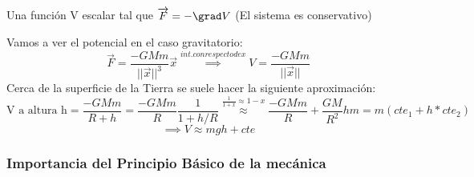 \begin{defn}
	Una función V escalar tal que $\overrightarrow F = -\grad V$ (El sistema es conservativo)
\end{defn}

\begin{example}
	Vamos a ver el potencial en el caso gravitatorio:
	$$\overrightarrow F = \frac{-GMm}{||\overrightarrow x||^3}\overrightarrow x \stackrel{int.con respecto de x}{\implies} V = \frac{-GMm}{||\overrightarrow x||}$$
	Cerca de la superficie de la Tierra se suele hacer la siguiente aproximación:
	$$\text{V a altura h} = \frac{-GMm}{R + h} = \frac{-GMm}{R} \frac{1}{1+ h/R} \stackrel{\frac{1}{1+x} \approx 1-x}{\approx} \frac{-GMm}{R} + \frac{GM}{R^2}hm = m(cte_1 + h*cte_2)$$$$\implies V\approx mgh + cte$$
\end{example}
\subsubsection{Importancia del Principio Básico de la mecánica}

